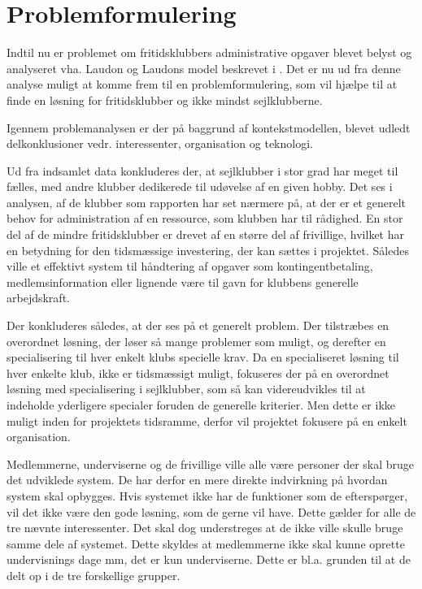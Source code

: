 \chapter{Problemformulering}\label{chap:problemformulering}

Indtil nu er problemet om fritidsklubbers administrative opgaver blevet belyst og analyseret vha. Laudon og Laudons model beskrevet i . Det er nu ud fra denne analyse muligt at komme frem til en problemformulering, som vil hjælpe til at finde en løsning for fritidsklubber og ikke mindst sejlklubberne.

Igennem problemanalysen er der på baggrund af kontekstmodellen, blevet udledt delkonklusioner vedr. interessenter, organisation og teknologi.

Ud fra indsamlet data konkluderes der, at sejlklubber i stor grad har meget til fælles, med andre klubber dedikerede til udøvelse af en given hobby. Det ses i analysen, af de klubber som rapporten har set nærmere på, at der er et generelt behov for administration af en ressource, som klubben har til rådighed. En stor del af de mindre fritidsklubber er drevet af en større del af frivillige, hvilket har en betydning for den tidsmæssige investering, der kan sættes i projektet. Således ville et effektivt system til håndtering af opgaver som kontingentbetaling, medlemsinformation eller lignende være til gavn for klubbens generelle arbejdskraft.

Der konkluderes således, at der ses på et generelt problem. Der tilstræbes en overordnet løsning, der løser så mange problemer som muligt, og derefter en specialisering til hver enkelt klubs specielle krav. Da en specialiseret løsning til hver enkelte klub, ikke er tidsmæssigt muligt, fokuseres der på en overordnet løsning med specialisering i sejlklubber, som så kan videreudvikles til at indeholde yderligere specialer foruden de generelle kriterier. Men dette er ikke muligt inden for projektets tidsramme, derfor vil projektet fokusere på en enkelt organisation.

Medlemmerne, underviserne og de frivillige ville alle være personer der skal bruge det udviklede system. De har derfor en mere direkte indvirkning på hvordan system skal opbygges. Hvis systemet ikke har de funktioner som de efterspørger, vil det ikke være den gode løsning, som de gerne vil have. Dette gælder for alle de tre nævnte interessenter. Det skal dog understreges at de ikke ville skulle bruge samme dele af systemet. Dette skyldes at medlemmerne ikke skal kunne oprette undervisnings dage mm, det er kun underviserne. Dette er bl.a. grunden til at de delt op i de tre forskellige grupper. 

